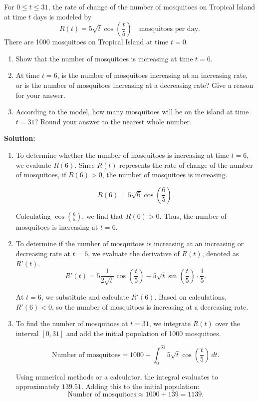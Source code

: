 \documentclass[12pt]{article}
\theoremstyle{beautifulthm}
\begin{document}
\begin{tcolorbox}[colback=examplebg, colframe=red!75!black, title=\textbf{EXAMPLE 1:}, fonttitle=\bfseries, sharp corners]
For $0 \leq t \leq 31$, the rate of change of the number of mosquitoes on Tropical Island at time $t$ days is modeled by 
\[
R(t) = 5\sqrt{t} \cos\left(\frac{t}{5}\right) \quad \text{mosquitoes per day}.
\]
There are 1000 mosquitoes on Tropical Island at time $t = 0$.

\begin{enumerate}
    \item[(a)] Show that the number of mosquitoes is increasing at time $t = 6$.
    \item[(b)] At time $t = 6$, is the number of mosquitoes increasing at an increasing rate, or is the number of mosquitoes increasing at a decreasing rate? Give a reason for your answer.
    \item[(c)] According to the model, how many mosquitoes will be on the island at time $t = 31$? Round your answer to the nearest whole number.
\end{enumerate}


\tcblower
\textbf{Solution:} 

\begin{enumerate}
    \item[(a)] To determine whether the number of mosquitoes is increasing at time $t = 6$, we evaluate $R(6)$. Since $R(t)$ represents the rate of change of the number of mosquitoes, if $R(6) > 0$, the number of mosquitoes is increasing.

    \[
    R(6) = 5\sqrt{6} \cos\left(\frac{6}{5}\right).
    \]

    Calculating $\cos\left(\frac{6}{5}\right)$, we find that $R(6) > 0$. Thus, the number of mosquitoes is increasing at $t = 6$.

    \item[(b)] To determine if the number of mosquitoes is increasing at an increasing or decreasing rate at $t = 6$, we evaluate the derivative of $R(t)$, denoted as $R'(t)$. 
    \[
    R'(t) = 5 \frac{1}{2\sqrt{t}} \cos\left(\frac{t}{5}\right) - 5\sqrt{t} \sin\left(\frac{t}{5}\right) \cdot \frac{1}{5}.
    \]

    At $t = 6$, we substitute and calculate $R'(6)$. Based on calculations, $R'(6) < 0$, so the number of mosquitoes is increasing at a decreasing rate.

    \item[(c)] To find the number of mosquitoes at $t = 31$, we integrate $R(t)$ over the interval $[0, 31]$ and add the initial population of 1000 mosquitoes.

    \[
    \text{Number of mosquitoes} = 1000 + \int_0^{31} 5\sqrt{t} \cos\left(\frac{t}{5}\right) \, dt.
    \]

    Using numerical methods or a calculator, the integral evaluates to approximately $139.51$. Adding this to the initial population:
    \[
    \text{Number of mosquitoes} \approx 1000 + 139 = 1139.
    \]
\end{enumerate}
\end{tcolorbox}
\end{document}
